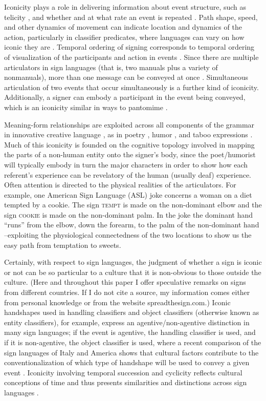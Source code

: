 \documentclass[output=paper,
modfonts
]{LSP/langsci}
\begin{document}
Iconicity plays a role in delivering information about event structure,
such as telicity \citep{wilbur2003,wilbur2008,wilbur2008,strickland2015,schlenker2016n}, and whether and at what rate an event is
repeated \citep{kuhn2016}. Path shape, speed, and other
dynamics of movement can indicate location and dynamics of the action,
particularly in classifier predicates, where languages can vary on how
iconic they are \citep{aronoff2003,tumtavitikul2009}. Temporal ordering of signing corresponds to temporal ordering of
visualization of the participants and action in events \citep{napoli2014n,napoli-forthcoming}.
Since there are multiple articulators in sign languages (that is, two
manuals plus a variety of nonmanuals), more than one message can be
conveyed at once \citep{vermeerbergen2007,napoli2010}. Simultaneous articulation of two events that occur
simultaneously is a further kind of iconicity. Additionally, a signer
can embody a participant in the event being conveyed, which is an
iconicity similar in ways to pantomime \citep{metzger2001}.

Meaning-form relationships are exploited across all components of the
grammar in innovative creative language \citep{sutton2016},
as in poetry \citep{bauman2006,sutton2010,sutton2013}, humor \citep{sutton2009}, and taboo expressions \citep{mirus2012,napoli2013}. Much of this iconicity is founded on the
cognitive topology involved in mapping the parts of a non-human entity
onto the signer's body, since the poet/humorist will typically embody in
turn the major characters in order to show how each referent's
experience can be revelatory of the human (usually deaf) experience.
Often attention is directed to the physical realities of the
articulators. For example, one American Sign Language (ASL) joke
concerns a woman on a diet tempted by a cookie. The sign \textsc{tempt}
is made on the non-dominant elbow and the sign \textsc{cookie} is made
on the non-dominant palm. In the joke the dominant hand ``runs'' from
the elbow, down the forearm, to the palm of the non-dominant hand
--exploiting the physiological connectedness of the two locations to
show us the easy path from temptation to sweets.

Certainly, with respect to sign languages, the judgment of whether a
sign is iconic or not can be so particular to a culture that it is
non-obvious to those outside the culture. (Here and throughout this
paper I offer speculative remarks on signs from different countries. If
I do not cite a source, my information comes either from personal
knowledge or from the website spreadthesign.com.) Iconic handshapes used
in handling classifiers and object classifiers (otherwise known as
entity classifiers), for example, express an agentive/non-agentive
distinction in many sign languages; if the event is agentive, the
handling classifier is used, and if it is non-agentive, the object
classifier is used, where a recent comparison of the sign languages of
Italy and America shows that cultural factors contribute to the
conventionalization of which type of handshape will be used to convey a
given event \citep{brentari2015}. Iconicity involving temporal
succession and cyclicity reflects cultural conceptions of time and thus
presents similarities and distinctions across sign languages \citep{kosecki2014}.
\end{document}

